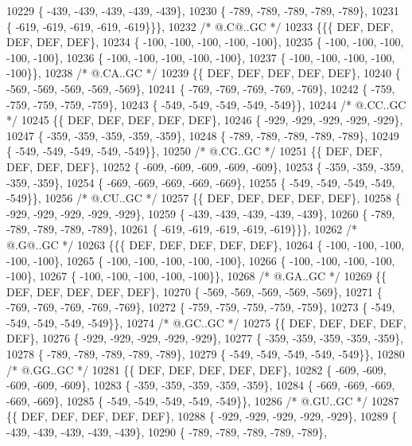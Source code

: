 \begin{DoxyCode}
10229 \{ -439, -439, -439, -439, -439\},
10230 \{ -789, -789, -789, -789, -789\},
10231 \{ -619, -619, -619, -619, -619\}\}\},
10232 \textcolor{comment}{/*  @.C@..GC */}
10233 \{\{\{  DEF,  DEF,  DEF,  DEF,  DEF\},
10234 \{ -100, -100, -100, -100, -100\},
10235 \{ -100, -100, -100, -100, -100\},
10236 \{ -100, -100, -100, -100, -100\},
10237 \{ -100, -100, -100, -100, -100\}\},
10238 \textcolor{comment}{/*  @.CA..GC */}
10239 \{\{  DEF,  DEF,  DEF,  DEF,  DEF\},
10240 \{ -569, -569, -569, -569, -569\},
10241 \{ -769, -769, -769, -769, -769\},
10242 \{ -759, -759, -759, -759, -759\},
10243 \{ -549, -549, -549, -549, -549\}\},
10244 \textcolor{comment}{/*  @.CC..GC */}
10245 \{\{  DEF,  DEF,  DEF,  DEF,  DEF\},
10246 \{ -929, -929, -929, -929, -929\},
10247 \{ -359, -359, -359, -359, -359\},
10248 \{ -789, -789, -789, -789, -789\},
10249 \{ -549, -549, -549, -549, -549\}\},
10250 \textcolor{comment}{/*  @.CG..GC */}
10251 \{\{  DEF,  DEF,  DEF,  DEF,  DEF\},
10252 \{ -609, -609, -609, -609, -609\},
10253 \{ -359, -359, -359, -359, -359\},
10254 \{ -669, -669, -669, -669, -669\},
10255 \{ -549, -549, -549, -549, -549\}\},
10256 \textcolor{comment}{/*  @.CU..GC */}
10257 \{\{  DEF,  DEF,  DEF,  DEF,  DEF\},
10258 \{ -929, -929, -929, -929, -929\},
10259 \{ -439, -439, -439, -439, -439\},
10260 \{ -789, -789, -789, -789, -789\},
10261 \{ -619, -619, -619, -619, -619\}\}\},
10262 \textcolor{comment}{/*  @.G@..GC */}
10263 \{\{\{  DEF,  DEF,  DEF,  DEF,  DEF\},
10264 \{ -100, -100, -100, -100, -100\},
10265 \{ -100, -100, -100, -100, -100\},
10266 \{ -100, -100, -100, -100, -100\},
10267 \{ -100, -100, -100, -100, -100\}\},
10268 \textcolor{comment}{/*  @.GA..GC */}
10269 \{\{  DEF,  DEF,  DEF,  DEF,  DEF\},
10270 \{ -569, -569, -569, -569, -569\},
10271 \{ -769, -769, -769, -769, -769\},
10272 \{ -759, -759, -759, -759, -759\},
10273 \{ -549, -549, -549, -549, -549\}\},
10274 \textcolor{comment}{/*  @.GC..GC */}
10275 \{\{  DEF,  DEF,  DEF,  DEF,  DEF\},
10276 \{ -929, -929, -929, -929, -929\},
10277 \{ -359, -359, -359, -359, -359\},
10278 \{ -789, -789, -789, -789, -789\},
10279 \{ -549, -549, -549, -549, -549\}\},
10280 \textcolor{comment}{/*  @.GG..GC */}
10281 \{\{  DEF,  DEF,  DEF,  DEF,  DEF\},
10282 \{ -609, -609, -609, -609, -609\},
10283 \{ -359, -359, -359, -359, -359\},
10284 \{ -669, -669, -669, -669, -669\},
10285 \{ -549, -549, -549, -549, -549\}\},
10286 \textcolor{comment}{/*  @.GU..GC */}
10287 \{\{  DEF,  DEF,  DEF,  DEF,  DEF\},
10288 \{ -929, -929, -929, -929, -929\},
10289 \{ -439, -439, -439, -439, -439\},
10290 \{ -789, -789, -789, -789, -789\},

\end{DoxyCode}
